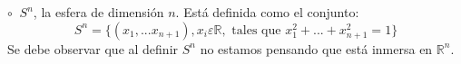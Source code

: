 $\circ \;\; S^n$, la esfera de dimensi\'on $n$. Est\'a definida como el conjunto:
\[
S^n = \{(x_1,...x_{n+1}), x_i \varepsilon \mathbb{R}, \text{  tales que   } x_1^2+...+x_{n+1}^2=1 \}
\]
Se debe observar que al definir $S^n$ no estamos pensando que est\'a inmersa en $\mathbb{R}^n$. 


%



